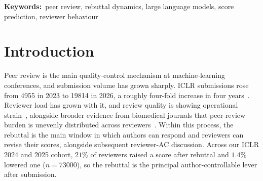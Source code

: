 \documentclass{article}
\providecommand{\keywords}[1]{%
  \vspace{0.5em}\noindent\textbf{Keywords:}\ #1\par\vspace{0.5em}%
}
\begin{document}
\keywords{peer review, rebuttal dynamics, large language models, score prediction, reviewer behaviour}

\section{Introduction}\label{sec:intro}

Peer review is the main quality-control mechanism at machine-learning conferences, and submission volume has grown sharply. ICLR submissions rose from \num{4955} in 2023 to \num{19814} in 2026, a roughly four-fold increase in four years~\cite{papercopilot}. Reviewer load has grown with it, and review quality is showing operational strain~\cite{adam}, alongside broader evidence from biomedical journals that peer-review burden is unevenly distributed across reviewers~\cite{kovanis}. Within this process, the rebuttal is the main window in which authors can respond and reviewers can revise their scores, alongside subsequent reviewer-AC discussion. Across our ICLR 2024 and 2025 cohort, $21\%$ of reviewers raised a score after rebuttal and $1.4\%$ lowered one ($n = \num{73000}$), so the rebuttal is the principal author-controllable lever after submission.
\end{document}
